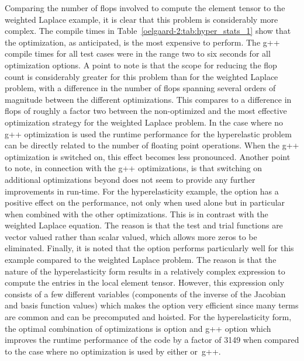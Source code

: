 
Comparing the number of flops involved to compute the element tensor
to the weighted Laplace example, it is clear that this problem is
considerably more complex.  The \ffc{} compile times in
Table~\ref{oelgaard-2:tab:hyper_stats_1} show that the 
optimization, as anticipated, is the most expensive to perform.  The
g++ compile times for all test cases were in the range two to six
seconds for all optimization options.  A point to note is that the
scope for reducing the flop count is considerably greater for this
problem than for the weighted Laplace problem, with a difference in
the number of flops spanning several orders of magnitude between the
different
\ffc{} optimizations.  This compares to a difference in flops of
roughly a factor two between the non-optimized and the most effective
optimization strategy for the weighted Laplace problem.  In the case
where no g++ optimization is used the runtime performance for the
hyperelastic problem can be directly related to the number of floating
point operations.  When the g++ optimization  is switched on,
this effect becomes less pronounced.  Another point to note, in
connection with the g++ optimizations, is that switching on additional
optimizations beyond  does not seem to provide any further
improvements in run-time.  For the hyperelasticity example, the option
 has a positive effect on the performance, not only when
used alone but in particular when combined with the other \ffc{}
optimizations.  This is in contrast with the weighted Laplace
equation. The reason is that the test and trial functions are vector
valued rather than scalar valued, which allows more zeros to be
eliminated.  Finally, it is noted that the  option
performs particularly well for this example compared to the weighted
Laplace problem.  The reason is that the nature of the hyperelasticity
form results in a relatively complex expression to compute the entries
in the local element tensor.  However, this expression only consists
of a few different variables (components of the inverse of the
Jacobian and basis function values) which makes the 
option very efficient since many terms are common and can be
precomputed and hoisted.  For the hyperelasticity form, the optimal
combination of optimizations is \ffc{} option  and
g++ option  which improves the runtime
performance of the code by a factor of 3149 when compared to the case
where no optimization is used by either \ffc{} or~g++.

